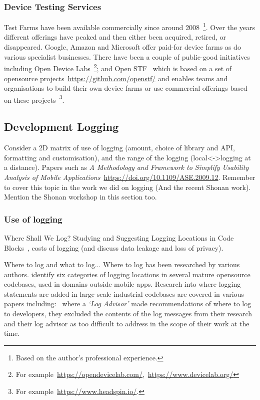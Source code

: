 \subsubsection{Device Testing Services}
Test Farms have been available commercially since around 2008~\footnote{Based on the author's professional experience.}. Over the years different offerings have peaked and then either been acquired, retired, or disappeared. Google, Amazon and Microsoft offer paid-for device farms as do various specialist businesses. There have been a couple of public-good initiatives including Open Device Labs~\footnote{For example~\url{https://opendevicelab.com/},~\url{https://www.devicelab.org/}}; and Open STF~\cite{openstf_website} which is based on a set of opensource projects~\url{https://github.com/openstf/} and enables teams and organisations to build their own device farms or use commercial offerings based on these projects~\footnote{For example~\url{https://www.headspin.io/}.}.


\subsection{Development Logging}
Consider a 2D matrix of use of logging (amount, choice of library and API, formatting and customisation), and the range of the logging (local<->logging at a distance). Papers such as \emph{A Methodology and Framework to Simplify Usability Analysis of Mobile Applications}~\url{https://doi.org/10.1109/ASE.2009.12}. Remember to cover this topic in the work we did on logging (And the recent Shonan work). Mention the Shonan workshop in this section too.

\subsubsection{Use of logging}

Where Shall We Log? Studying and Suggesting Logging Locations in Code Blocks~\cite{li2020_where_shall_we_log}, costs of logging (and discuss data leakage and loss of privacy).


Where to log and what to log... Where to log has been researched by various authors. \cite{li2020_where_shall_we_log} identify six categories of logging locations in several mature opensource codebases, used in domains outside mobile apps. Research into where logging statements are added in large-scale industrial codebases are covered in various papers including:~\cite{zhu2015_learning_to_log} where a \emph{`Log Advisor'} made recommendations of where to log to developers, they excluded the contents of the log messages from their research and their log advisor as too difficult to address in the scope of their work at the time.

